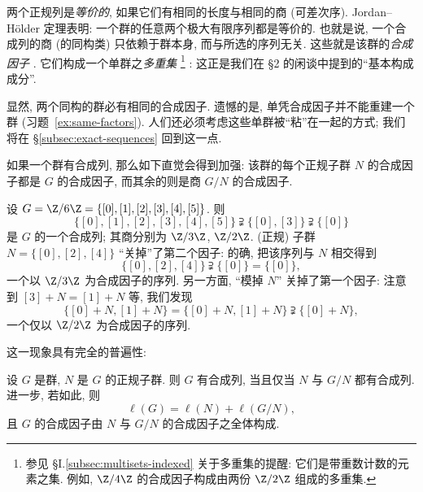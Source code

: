 两个正规列是\emph{等价的}, 如果它们有相同的长度与相同的商 (可差次序). Jordan--H\"older 定理表明: 一个群的任意两个极大有限序列都是等价的. 也就是说, 一个合成列的商 (的同构类) 只依赖于群本身, 而与所选的序列无关. 这些就是该群的\emph{合成因子}%
. 它们构成一个单群之\emph{多重集}%
%
\footnote{参见 \S I.\ref{subsec:multisets-indexed} 关于多重集的提醒: 它们是带重数计数的元素之集. 例如, $\Z/4\Z$ 的合成因子构成由两份 $\Z/2\Z$ 组成的多重集.}%
: 这正是我们在 \S 2 的闲谈中提到的``基本构成成分''.

显然, 两个同构的群必有相同的合成因子. 遗憾的是, 单凭合成因子并不能重建一个群 (习题~\ref{ex:same-factors}). 人们还必须考虑这些单群被``粘''在一起的方式; 我们将在 \S\ref{subsec:exact-sequences} 回到这一点.

如果一个群有合成列, 那么如下直觉会得到加强: 该群的每个正规子群 $N$ 的合成因子都是 $G$ 的合成因子, 而其余的则是商 $G/N$ 的合成因子.

\begin{example}
\label{ex:z6-composition}
设 $G = \Z/6\Z = \{[0], [1], [2], [3], [4], [5]\}$. 则
\[
\{[0],[1],[2],[3],[4],[5]\} \supsetneqq \{[0],[3]\} \supsetneqq \{[0]\}
\]
是 $G$ 的一个合成列; 其商分别为 $\Z/3\Z$, $\Z/2\Z$. (正规) 子群 $N = \{[0],[2],[4]\}$ ``关掉''了第二个因子: 的确, 把该序列与 $N$ 相交得到
\[
\{[0],[2],[4]\} \supsetneqq \{[0]\} = \{[0]\},
\]
一个以 $\Z/3\Z$ 为合成因子的序列. 另一方面, ``模掉 $N$'' 关掉了第一个因子: 注意到 $[3] + N = [1] + N$ 等, 我们发现
\[
\{[0]+N, [1]+N\} = \{[0]+N,[1]+N\} \supsetneqq \{[0]+N\},
\]
一个仅以 $\Z/2\Z$ 为合成因子的序列.
\end{example}

这一现象具有完全的普遍性:

\begin{proposition}
\label{prop:composition-length}
设 $G$ 是群, $N$ 是 $G$ 的正规子群. 则 $G$ 有合成列, 当且仅当 $N$ 与 $G/N$ 都有合成列. 进一步, 若如此, 则
\[
\ell(G) = \ell(N) + \ell(G/N),
\]
且 $G$ 的合成因子由 $N$ 与 $G/N$ 的合成因子之全体构成.
\end{proposition}

